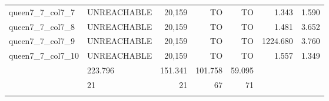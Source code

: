 \begin{tabular}{llr|rrrr}
  queen7\_7\_col7\_7 & UNREACHABLE & 20,159 & TO & TO & 1.343 & 1.590 \\
  queen7\_7\_col7\_8 & UNREACHABLE & 20,159 & TO & TO & 1.481 & 3.652 \\
  queen7\_7\_col7\_9 & UNREACHABLE & 20,159 & TO & TO & 1224.680 & 3.760 \\ %
  queen7\_7\_col7\_10 & UNREACHABLE & 20,159 & TO & TO & 1.557 & 1.349 \\ \bhline
  \multicolumn{3}{r|}{平均CPU時間} & 223.796 & 151.341 & 101.758 & 59.095 \\ \bhline
  \multicolumn{3}{r|}{解けた問題数} & 21 & 21 & 67 & 71 \\ \bhline
\end{tabular}

